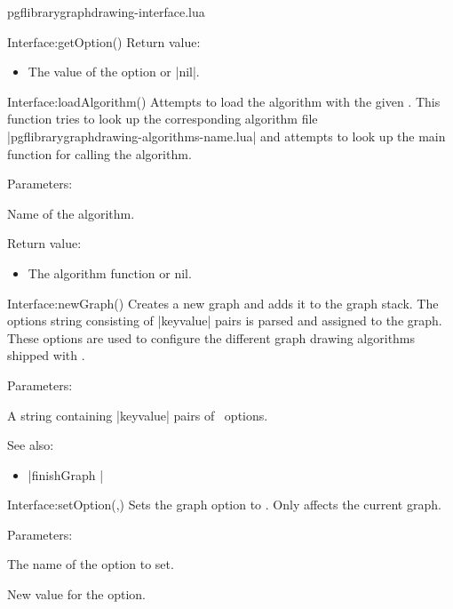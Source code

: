 \begin{filedescription}{pgflibrarygraphdrawing-interface.lua}
\begin{luacommand}{{Interface:getOption}()}
Return value:
\begin{itemize} \item[] The value of the  option or |nil|.  \end{itemize}


\end{luacommand}\begin{luacommand}{{Interface:loadAlgorithm}()}
Attempts to load the algorithm with the given .  This function tries to look up the corresponding algorithm file |pgflibrarygraphdrawing-algorithms-name.lua| and attempts to look up the main function for calling the algorithm. 

Parameters:
\begin{parameterdescription}
	\item[\meta{name}] Name of the algorithm. 
\end{parameterdescription}


Return value:
\begin{itemize} \item[] The algorithm function or nil.  \end{itemize}


\end{luacommand}\begin{luacommand}{{Interface:newGraph}()}
Creates a new graph and adds it to the graph stack.  The options string consisting of |{key}{value}| pairs is parsed and assigned to the graph. These options are used to configure the different graph drawing algorithms shipped with \tikzname. 

Parameters:
\begin{parameterdescription}
	\item[\meta{options}] A string containing |{key}{value}| pairs of \tikzname\ options. 
\end{parameterdescription}



See also:
\begin{itemize}
	\item[] |finishGraph |
\end{itemize}

\end{luacommand}\begin{luacommand}{{Interface:setOption}(,)}
Sets the graph option  to . Only affects the current graph. 

Parameters:
\begin{parameterdescription}
	\item[\meta{name}] The name of the option to set.\item[\meta{value}] New value for the option. 
\end{parameterdescription}



\end{luacommand}
\end{filedescription}